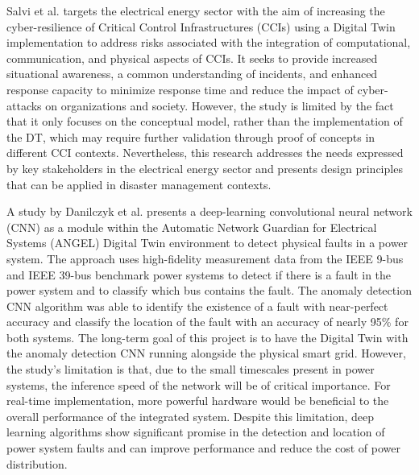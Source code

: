 Salvi et al.\cite{salviCyberresilienceCriticalCyber2022} targets the electrical energy sector with the aim of increasing the cyber-resilience of Critical Control Infrastructures (CCIs) using a Digital Twin implementation to address risks associated with the integration of computational, communication, and physical aspects of CCIs. It seeks to provide increased situational awareness, a common understanding of incidents, and enhanced response capacity to minimize response time and reduce the impact of cyber-attacks on organizations and society. However, the study is limited by the fact that it only focuses on the conceptual model, rather than the implementation of the DT, which may require further validation through proof of concepts in different CCI contexts. Nevertheless, this research addresses the needs expressed by key stakeholders in the electrical energy sector and presents design principles that can be applied in disaster management contexts.


A study by Danilczyk et al.\cite{danilczykSmartGridAnomaly2021} presents a deep-learning convolutional neural network (CNN) as a module within the Automatic Network Guardian for Electrical Systems (ANGEL) Digital Twin environment to detect physical faults in a power system. The approach uses high-fidelity measurement data from the IEEE 9-bus and IEEE 39-bus benchmark power systems to detect if there is a fault in the power system and to classify which bus contains the fault. The anomaly detection CNN algorithm was able to identify the existence of a fault with near-perfect accuracy and classify the location of the fault with an accuracy of nearly 95\% for both systems. The long-term goal of this project is to have the Digital Twin with the anomaly detection CNN running alongside the physical smart grid. However, the study's limitation is that, due to the small timescales present in power systems, the inference speed of the network will be of critical importance. For real-time implementation, more powerful hardware would be beneficial to the overall performance of the integrated system. Despite this limitation, deep learning algorithms show significant promise in the detection and location of power system faults and can improve performance and reduce the cost of power distribution.

